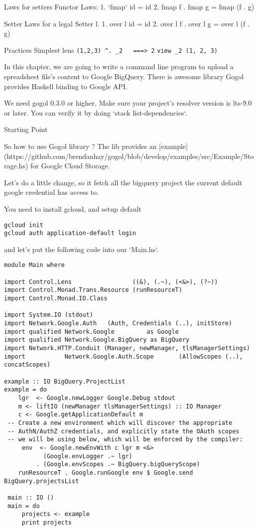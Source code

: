 Laws for setters
Functor Laws:
1. `fmap` id = id
2. fmap f . fmap g = fmap (f . g)

Setter Laws for a legal Setter l.
1. over l id = id
2. over l f . over l g = over l (f . g)


Practices
Simplest lens
\verb|(1,2,3) ^. _2   ===> 2|
\verb|view _2 (1, 2, 3)|



In this chapter, we are going to write a command line program to upload a spreadsheet file's content to Google BigQuery. There is awesome library Gogol provides Haskell binding to Google API.



We need gogol 0.3.0 or higher, Make sure your project's resolver version is lts-9.0 or later. You can verify it by doing `stack list-dependencies`.

Starting Point

So how to use Gogol library ? The lib provides an [example](https://github.com/brendanhay/gogol/blob/develop/examples/src/Example/Storage.hs) for Google Cloud Storage.

Let's do a little change, so it fetch all the bigquery project the current default google credential has access to.

You need to install gcloud, and setup default
\begin{verbatim}
gcloud init
gcloud auth application-default login
\end{verbatim}

and let's put the following code into our `Main.hs`.

\begin{verbatim}
module Main where

import Control.Lens                 ((&), (.~), (<&>), (?~))
import Control.Monad.Trans.Resource (runResourceT)
import Control.Monad.IO.Class

import System.IO (stdout)
import Network.Google.Auth   (Auth, Credentials (..), initStore)
import qualified Network.Google         as Google
import qualified Network.Google.BigQuery as BigQuery
import Network.HTTP.Conduit (Manager, newManager, tlsManagerSettings)
import           Network.Google.Auth.Scope       (AllowScopes (..),                                                  concatScopes)

example :: IO BigQuery.ProjectList
example = do
    lgr  <- Google.newLogger Google.Debug stdout
    m <- liftIO (newManager tlsManagerSettings) :: IO Manager
    c <- Google.getApplicationDefault m
 -- Create a new environment which will discover the appropriate
 -- AuthN/AuthZ credentials, and explicitly state the OAuth scopes
 -- we will be using below, which will be enforced by the compiler:
     env  <- Google.newEnvWith c lgr m <&>
           (Google.envLogger .~ lgr)
         . (Google.envScopes .~ BigQuery.bigQueryScope)
    runResourceT . Google.runGoogle env $ Google.send BigQuery.projectsList

 main :: IO ()
 main = do
     projects <- example
     print projects
\end{verbatim}

